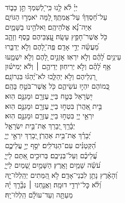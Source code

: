 \documentclass[twoside, openany, parskip=half, 11pt]{book}
\begin{document}
{\begin{narrow}
\\
יְיָ֗ לֹ֫א לָ֥נוּ \hfill כִּֽי־לְ֭שִׁמְךָ תֵּ֣ן כָּב֑וֹד \\ עַל־חַ֝סְדְּךָ֗ עַל־אֲמִתֶּֽךָ׃ \hfill
לָ֭מָּה יֹאמְר֣וּ הַגּוֹיִ֑ם\\ אַיֵּה־נָ֗֝א אֱלֹהֵיהֶֽם׃ \hfill
וֵאלֹהֵ֥ינוּ בַשָּׁמָ֑יִם\\ כֹּ֖ל אֲשֶׁר־חָפֵ֣ץ עָשָֽׂה׃ \hfill
עֲֽ֭צַבֵּיהֶם כֶּ֣סֶף וְזָהָ֑ב\\ מַ֝עֲשֵׂ֗ה יְדֵ֣י אָדָֽם׃ \hfill
פֶּֽה־לָ֭הֶם וְלֹ֣א יְדַבֵּ֑רוּ\\ עֵינַ֥יִם לָ֝הֶ֗ם וְלֹ֣א יִרְאֽוּ׃ \hfill
אׇזְנַ֣יִם לָ֭הֶם וְלֹ֣א יִשְׁמָ֑עוּ\\ אַ֥ף לָ֝הֶ֗ם וְלֹ֣א יְרִיחֽוּן׃ \hfill
יְדֵיהֶ֤ם ׀ וְלֹ֬א יְמִישׁ֗וּן\\ רַ֭גְלֵיהֶם וְלֹ֣א יְהַלֵּ֑כוּ \hfill לֹא־יֶ֝הְגּ֗וּ בִּגְרוֹנָֽם׃ \\
כְּ֭מוֹהֶם יִהְי֣וּ עֹשֵׂיהֶ֑ם \hfill כֹּ֖ל אֲשֶׁר־בֹּטֵ֣חַ בָּהֶֽם׃ \\
יִ֭שְׂרָאֵל בְּטַ֣ח בַּייָ֑ \hfill עֶזְרָ֖ם וּמָגִנָּ֣ם הֽוּא׃ \\
בֵּ֣ית אַ֭הֲרֹן בִּטְח֣וּ בַייָ֑ \hfill עֶזְרָ֖ם וּמָגִנָּ֣ם הֽוּא׃ \\
יִרְאֵ֣י יְיָ֭ בִּטְח֣וּ בַייָ֑ \hfill עֶזְרָ֖ם וּמָגִנָּ֣ם הֽוּא׃ \\

יְבָ֫רֵ֥ךְ יְ֭בָרֵךְ \hfill אֶת־בֵּ֣ית יִשְׂרָאֵ֑ל\\ יְ֝בָרֵ֗ךְ אֶת־בֵּ֥ית אַהֲרֹֽן׃ \hfill
יְ֭בָרֵךְ יִרְאֵ֣י יְיָ֑\\ הַ֝קְּטַנִּ֗ים עִם־הַגְּדֹלִֽים׃ \hfill
יֹסֵ֣ף יְיָ֣ עֲלֵיכֶ֑ם\\ עֲ֝לֵיכֶ֗ם וְעַל־בְּנֵיכֶֽם׃ \hfill
בְּרוּכִ֣ים אַ֭תֶּם לַייָ֑\\ עֹ֝שֵׂ֗ה שָׁמַ֥יִם וָאָֽרֶץ׃ \hfill
הַשָּׁמַ֣יִם שָׁ֭מַיִם לַייָ֑\\ וְ֝הָאָ֗רֶץ נָתַ֥ן לִבְנֵי־אָדָֽם׃ \hfill
לֹ֣א הַ֭מֵּתִים יְהַֽלְלוּ־יָ֑הּ\\ וְ֝לֹ֗א כׇּל־יֹרְדֵ֥י דוּמָֽה׃ \hfill
וַאֲנַ֤חְנוּ ׀ נְבָ֘רֵ֤ךְ יָ֗הּ\\ מֵעַתָּ֥ה וְעַד־עוֹלָ֗ם הַֽלְלוּ־יָֽהּ׃ \hfill \break



\end{narrow}}
\end{document}
